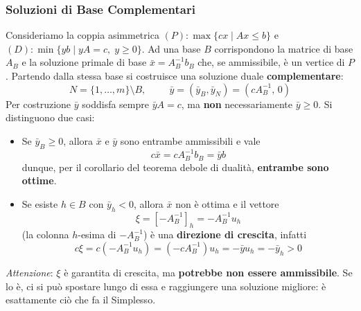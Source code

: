 \documentclass[12pt]{extarticle} %
\begin{document}
\subsubsection{Soluzioni di Base Complementari}
Consideriamo la coppia asimmetrica $(P): \max\{cx \mid Ax \le b\}$ e $(D): \min\{yb \mid yA = c, \; y \ge 0\}$. Ad una base $B$ corrispondono la matrice di base $A_B$ e la soluzione primale di base $\bar{x} = A_B^{-1}b_B$ che, se ammissibile, è un vertice di $P$. Partendo dalla stessa base si costruisce una soluzione duale \textbf{complementare}:
\[
N = \{1,\dots,m\}\setminus B, \hspace{1cm} \bar{y} = (\bar{y}_B, \bar{y}_N) = (cA_B^{-1},\, 0)
\]
Per costruzione $\bar{y}$ soddisfa sempre $\bar{y}A = c$, ma \textbf{non} necessariamente $\bar{y} \ge 0$. Si distinguono due casi:
\begin{itemize}
    \item Se $\bar{y}_B \ge 0$, allora $\bar{x}$ e $\bar{y}$ sono entrambe ammissibili e vale
    \[
    c\bar{x} = cA_B^{-1}b_B = \bar{y}b
    \]
    dunque, per il corollario del teorema debole di dualità, \textbf{entrambe sono ottime}.
    \item Se esiste $h \in B$ con $\bar{y}_h < 0$, allora $\bar{x}$ non è ottima e il vettore
    \[
    \xi = [-A_B^{-1}]_h = -A_B^{-1}u_h
    \]
    (la colonna $h$-esima di $-A_B^{-1}$) è una \textbf{direzione di crescita}, infatti
    \[
    c\xi = c(-A_B^{-1}u_h) = (-cA_B^{-1})u_h = -\bar{y}u_h = -\bar{y}_h > 0
    \]
\end{itemize}
\textit{Attenzione}: $\xi$ è garantita di crescita, ma \textbf{potrebbe non essere ammissibile}. Se lo è, ci si può spostare lungo di essa e raggiungere una soluzione migliore: è esattamente ciò che fa il Simplesso.
\end{document}
